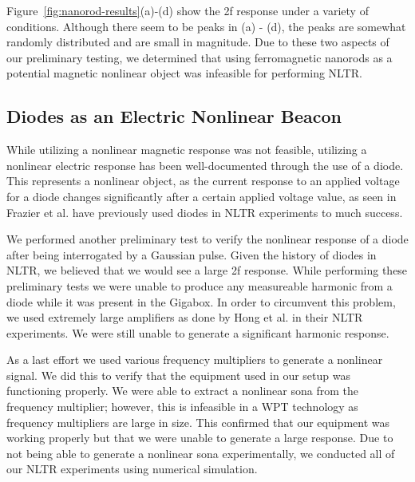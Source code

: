   Figure~\ref{fig:nanorod-results}(a)-(d) show the 2f response under a variety of conditions. Although there seem to be peaks in (a) - (d), the peaks are somewhat randomly distributed and are small in magnitude. Due to these two aspects of our preliminary testing, we determined that using ferromagnetic nanorods as a potential magnetic nonlinear object was infeasible for performing NLTR. 
  
\subsection{Diodes as an Electric Nonlinear Beacon}

While utilizing a nonlinear magnetic response was not feasible, utilizing a nonlinear electric response has been well-documented through the use of a diode. This represents a nonlinear object, as the current response to an applied voltage for a diode changes significantly after a certain applied voltage value, as seen in Frazier et al. have previously used diodes in NLTR experiments to much success.

We performed another preliminary test to verify the nonlinear response of a diode after being interrogated by a Gaussian pulse. Given the history of diodes in NLTR, we believed that we would see a large 2f response. While performing these preliminary tests we were unable to produce any measureable harmonic from a diode while it was present in the Gigabox. In order to circumvent this problem, we used extremely large amplifiers as done by Hong et al. in their NLTR experiments. We were still unable to generate a significant harmonic response.

As a last effort we used various frequency multipliers to generate a nonlinear signal. We did this to verify that the equipment used in our setup was functioning properly. We were able to extract a nonlinear sona from the frequency multiplier; however, this is infeasible in a WPT technology as frequency multipliers are large in size. This confirmed that our equipment was working properly but that we were unable to generate a large response. Due to not being able to generate a nonlinear sona experimentally, we conducted all of our NLTR experiments using numerical simulation.
